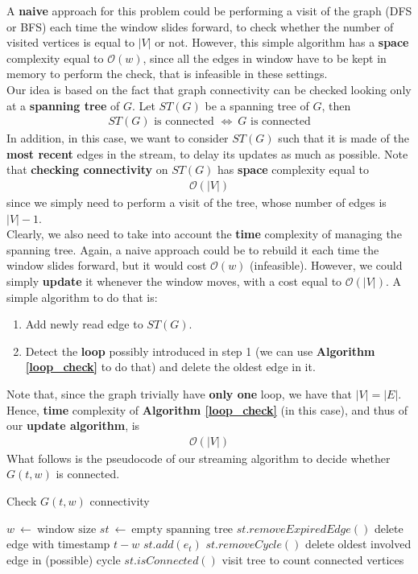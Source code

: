 A \textbf{naive} approach for this problem could be performing a visit of the graph (DFS or BFS) each time the window slides forward, to check whether the number of visited vertices is equal to $|V|$ or not. However, this simple algorithm has a \textbf{space} complexity equal to $\mathcal{O}(w)$, since all the edges in window have to be kept in memory to perform the check, that is infeasible in these settings.\\
Our idea is based on the fact that graph connectivity can be checked looking only at a \textbf{spanning tree} of $G$. Let $ST(G)$ be a spanning tree of $G$, then
\begin{align*}
ST(G)\text{ is connected }\Leftrightarrow \ G\text{ is connected}
\end{align*}
In addition, in this case, we want to consider $ST(G)$ such that it is made of the \textbf{most recent} edges in the stream, to delay its updates as much as possible. Note that \textbf{checking connectivity} on $ST(G)$ has \textbf{space} complexity equal to 
\begin{align*}
\mathcal{O}(|V|)
\end{align*}
since we simply need to perform a visit of the tree, whose number of edges is $|V| - 1$.\\
Clearly, we also need to take into account the \textbf{time} complexity of managing the spanning tree. Again, a naive approach could be to rebuild it each time the window slides forward, but it would cost $\mathcal{O}(w)$ (infeasible). However, we could simply \textbf{update} it whenever the window moves, with a cost equal to $\mathcal{O}(|V|)$. A simple algorithm to do that is:
\begin{enumerate}
	\item Add newly read edge to $ST(G)$.
	\item Detect the \textbf{loop} possibly introduced in step 1 (we can use \textbf{Algorithm \ref{loop_check}} to do that) and delete the oldest edge in it.
\end{enumerate}
Note that, since the graph trivially have \textbf{only one} loop, we have that $|V| = |E|$. Hence, \textbf{time} complexity of \textbf{Algorithm \ref{loop_check}} (in this case), and thus of our \textbf{update algorithm}, is
\begin{align*}
\mathcal{O}(|V|)
\end{align*}
What follows is the pseudocode of our streaming algorithm to decide whether $G(t,w)$ is connected.

\newpage
\begin{algorithm}
	\caption{Check $G(t,w)$ connectivity}
	\begin{algorithmic}[1]
		\State $w \ \leftarrow \ \text{window size}$
		\State $st \ \leftarrow \ \text{empty spanning tree}$
				\State $st.removeExpiredEdge()$ \Comment delete edge with timestamp $t-w$
			\EndIf
			\State $st.add(e_t)$
			\State $st.removeCycle()$ \Comment delete oldest involved edge in (possible) cycle
			\State \Return $st.isConnected()$  \Comment visit tree to count connected vertices
		\EndEvent
	\end{algorithmic}
\end{algorithm}
